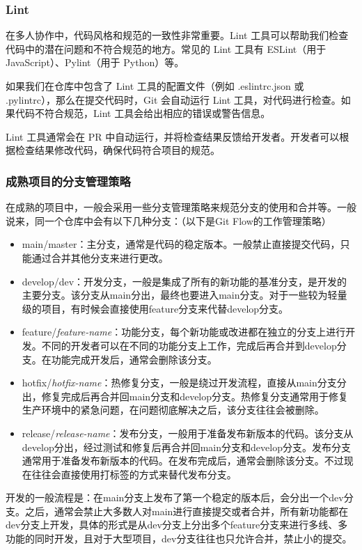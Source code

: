\subsubsection{Lint}

在多人协作中，代码风格和规范的一致性非常重要。Lint 工具可以帮助我们检查代码中的潜在问题和不符合规范的地方。常见的 Lint 工具有 ESLint（用于 JavaScript）、Pylint（用于 Python）等。

如果我们在仓库中包含了 Lint 工具的配置文件（例如 .eslintrc.json 或 .pylintrc），那么在提交代码时，Git 会自动运行 Lint 工具，对代码进行检查。如果代码不符合规范，Lint 工具会给出相应的错误或警告信息。

Lint 工具通常会在 PR 中自动运行，并将检查结果反馈给开发者。开发者可以根据检查结果修改代码，确保代码符合项目的规范。

\subsubsection{成熟项目的分支管理策略}

在成熟的项目中，一般会采用一些分支管理策略来规范分支的使用和合并等。一般说来，同一个仓库中会有以下几种分支：（以下是Git Flow的工作管理策略）
\begin{itemize}
  \item main/master：主分支，通常是代码的稳定版本。一般禁止直接提交代码，只能通过合并其他分支来进行更改。
  \item develop/dev：开发分支，一般是集成了所有的新功能的基准分支，是开发的主要分支。该分支从main分出，最终也要进入main分支。对于一些较为轻量级的项目，有时候会直接使用feature分支来代替develop分支。
  \item feature/\textit{feature-name}：功能分支，每个新功能或改进都在独立的分支上进行开发。不同的开发者可以在不同的功能分支上工作，完成后再合并到develop分支。在功能完成开发后，通常会删除该分支。
  \item hotfix/\textit{hotfix-name}：热修复分支，一般是绕过开发流程，直接从main分支分出，修复完成后再合并回main分支和develop分支。热修复分支通常用于修复生产环境中的紧急问题，在问题彻底解决之后，该分支往往会被删除。
  \item release/\textit{release-name}：发布分支，一般用于准备发布新版本的代码。该分支从develop分出，经过测试和修复后再合并回main分支和develop分支。发布分支通常用于准备发布新版本的代码。在发布完成后，通常会删除该分支。不过现在往往会直接使用打标签的方式来替代发布分支。
\end{itemize}

开发的一般流程是：在main分支上发布了第一个稳定的版本后，会分出一个dev分支。之后，通常会禁止大多数人对main进行直接提交或者合并，所有新功能都在dev分支上开发，具体的形式是从dev分支上分出多个feature分支来进行多线、多功能的同时开发，且对于大型项目，dev分支往往也只允许合并，禁止小的提交。

